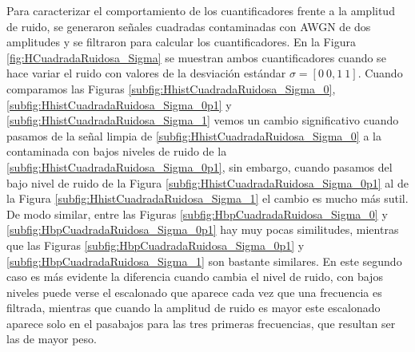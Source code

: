 Para caracterizar el comportamiento de los cuantificadores frente a la amplitud de ruido, se generaron señales cuadradas contaminadas con AWGN de dos amplitudes y se filtraron para calcular los cuantificadores.
En la Figura \ref{fig:HCuadradaRuidosa_Sigma} se muestran ambos cuantificadores cuando se hace variar el ruido con valores de la desviación estándar $\sigma=[0~0,1~1]$.
Cuando comparamos las Figuras \ref{subfig:HhistCuadradaRuidosa_Sigma_0}, \ref{subfig:HhistCuadradaRuidosa_Sigma_0p1} y \ref{subfig:HhistCuadradaRuidosa_Sigma_1} vemos un cambio significativo cuando pasamos de la señal limpia de \ref{subfig:HhistCuadradaRuidosa_Sigma_0} a la contaminada con bajos niveles de ruido de la \ref{subfig:HhistCuadradaRuidosa_Sigma_0p1}, sin embargo, cuando pasamos del bajo nivel de ruido de la Figura \ref{subfig:HhistCuadradaRuidosa_Sigma_0p1} al de la Figura \ref{subfig:HhistCuadradaRuidosa_Sigma_1} el cambio es mucho más sutil.
De modo similar, entre las Figuras \ref{subfig:HbpCuadradaRuidosa_Sigma_0} y \ref{subfig:HbpCuadradaRuidosa_Sigma_0p1} hay muy pocas similitudes, mientras que las Figuras \ref{subfig:HbpCuadradaRuidosa_Sigma_0p1} y \ref{subfig:HbpCuadradaRuidosa_Sigma_1} son bastante similares.
En este segundo caso es más evidente la diferencia cuando cambia el nivel de ruido, con bajos niveles puede verse el escalonado que aparece cada vez que una frecuencia es filtrada, mientras que cuando la amplitud de ruido es mayor este escalonado aparece solo en el pasabajos para las tres primeras frecuencias, que resultan ser las de mayor peso.
%
